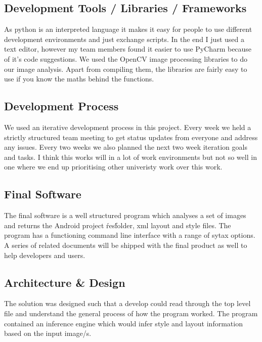 \documentclass{article}
\begin{document}
\subsection{Development Tools / Libraries / Frameworks}
As python is an interpreted language it makes it easy for people to use different development environments and just exchange scripts. In the end I just used a text editor, however my team members found it easier to use PyCharm because of it's code suggestions. We used the OpenCV image processing libraries to do our image analysis. Apart from compiling them, the libraries are fairly easy to use if you know the maths behind the functions.

\subsection{Development Process}
We used an iterative development process in this project. Every week we held a strictly structured team meeting to get status updates from everyone and address any issues. Every two weeks we also planned the next two week iteration goals and tasks. I think this works will in a lot of work environments but not so well in one where we end up prioritising other univeristy work over this work.

\subsection{Final Software}
The final software is a well structured program which analyses a set of images and returns the Android project \'res\' folder, xml layout and style files. The program has a functioning command line interface with a range of sytax options. A series of related documents will be shipped with the final product as well to help developers and users.

\subsection{Architecture \& Design}
The solution was designed such that a develop could read through the top level file and understand the general process of how the program worked. The program contained an inference engine which would infer style and layout information based on the input image/s.
\end{document}
